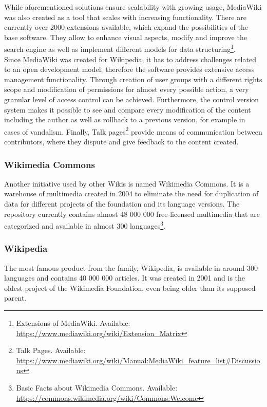 \documentclass[a4paper]{article}
\begin{document}
\noindent
While aforementioned solutions ensure scalability with growing usage, MediaWiki was also created as a tool that scales with increasing functionality. There are currently over 2000 extensions available, which expand the possibilities of the base software. They allow to enhance visual aspects, modify and improve the search engine as well as implement different models for data structuring\footnote{Extensions of MediaWiki. Available: \url{https://www.mediawiki.org/wiki/Extension_Matrix}}.\\

\noindent 
Since MediaWiki was created for Wikipedia, it has to address challenges related to an open development model, therefore the software provides extensive access management functionality. Through creation of user groups with a different rights scope and modification of permissions for almost every possible action, a very granular level of access control can be achieved. Furthermore, the control version system makes it possible to see and compare every modification of the content including the author as well as rollback to a previous version, for example in cases of vandalism. Finally, Talk pages\footnote{Talk Pages. Available: \url{https://www.mediawiki.org/wiki/Manual:MediaWiki_feature_list#Discussions}} provide means of communication between contributors, where they dispute and give feedback to the content created. 

\subsubsection{Wikimedia Commons} 
Another initiative used by other Wikis is named Wikimedia Commons. It is a warehouse of multimedia created in 2004 to eliminate the need for duplication of data for different projects of the foundation and its language versions. The repository currently contains almost 48 000 000 free-licensed multimedia that are categorized and available in almost 300 languages\footnote{Basic Facts about Wikimedia Commons. Available: \url{https://commons.wikimedia.org/wiki/Commons:Welcome}}.

\subsubsection{Wikipedia}
The most famous product from the family, Wikipedia, is available in around 300 languages and contains 40 000 000 articles. It was created in 2001 and is the oldest project of the Wikimedia Foundation, even being older than its supposed parent.\\
\end{document}
